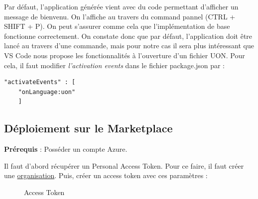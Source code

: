 \documentclass[
    iict, %
    il, %
]{heig-tb}
\begin{document}
Par défaut, l'application générée vient avec du code permettant d'afficher un message de bienvenu. On l'affiche au travers du command pannel (CTRL + SHIFT + P). On peut s'assurer comme cela que l'implémentation de base fonctionne correctement.
On constate donc que par défaut, l'application doit être lancé au travers d'une commande, mais pour notre cas il sera plus intéressant que VS Code nous propose les fonctionnalités à l'ouverture d'un fichier UON.
Pour cela, il faut modifier \emph{l'activation events} dans le fichier package.json par :
\begin{lstlisting}[frame=single]
    "activateEvents" : [
	"onLanguage:uon"
    ]
\end{lstlisting}

\subsection{Déploiement sur le Marketplace}


\textbf{Prérequis} : Posséder un compte Azure.

Il faut d'abord récupérer un Personal Access Token. Pour ce faire, il faut créer une \href{https://docs.microsoft.com/en-us/azure/devops/organizations/accounts/create-organization?view=azure-devops}{organisation}.
Puis, créer un access token avec ces paramètres :
\begin{figure}[!h]
    \begin{center}
    \end{center}
    \caption[Access Token]{\label{access-token}Access Token}
\end{figure}
\end{document}

